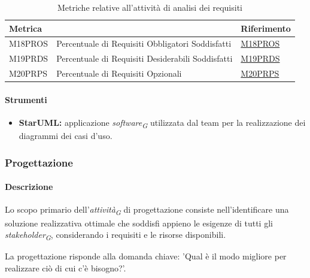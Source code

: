 \vspace{0.2cm}
\begin{table}[H]
    \centering
    \begin{tabular}{|C{3cm}|L{4cm}|C{3cm}|}
    \hline
    \textbf{Metrica} &  & \textbf{Riferimento} \\
    \hline \hline
    M18PROS & Percentuale di Requisiti Obbligatori Soddisfatti & \hyperlink{item:M18PROS}{M18PROS} \\
    M19PRDS & Percentuale di Requisiti Desiderabili Soddisfatti & \hyperlink{item:M19PRDS}{M19PRDS} \\
    M20PRPS & Percentuale di Requisiti Opzionali & \hyperlink{item:M20PRPS}{M20PRPS} \\
    \hline
    \end{tabular}
    \caption{Metriche relative all'attività di analisi dei requisiti}
\end{table}

\paragraph{Strumenti}
\begin{itemize}
    \item \textbf{StarUML:} applicazione \textit{software}\textsubscript{\textit{G}} utilizzata dal team per la realizzazione dei diagrammi dei casi d'uso.
\end{itemize}

\subsubsection{Progettazione}

\paragraph{Descrizione}
Lo scopo primario dell'\textit{attività}\textsubscript{\textit{G}} di progettazione consiste nell'identificare una soluzione realizzativa ottimale che soddisfi appieno le esigenze di tutti gli \textit{stakeholder}\textsubscript{\textit{G}}, considerando i requisiti e le risorse disponibili.

\vspace{0.2cm}

La progettazione risponde alla domanda chiave: 'Qual è il modo migliore per realizzare ciò di cui c'è bisogno?'.

\vspace{0.2cm}

